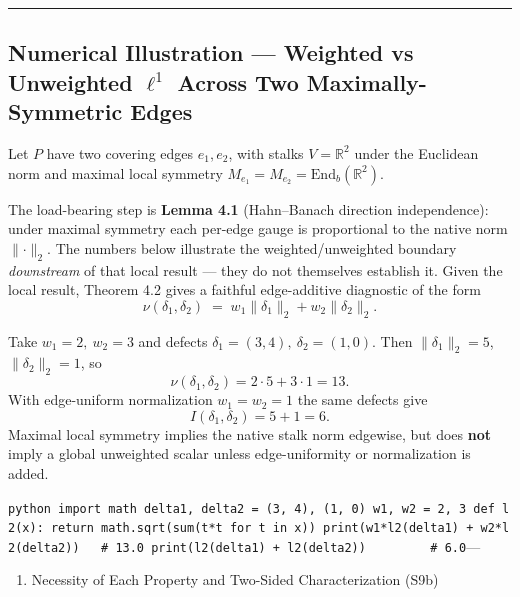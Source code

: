 \documentclass[
  11pt,
]{article}
\providecommand{\tightlist}{%
  \setlength{\itemsep}{0pt}\setlength{\parskip}{0pt}}
\providecommand{\tightlist}{%
  \setlength{\itemsep}{0pt}\setlength{\parskip}{0pt}}
\begin{document}
\begin{center}\rule{0.5\linewidth}{0.5pt}\end{center}

\subsection{\texorpdfstring{Numerical Illustration --- Weighted vs Unweighted \(\ell^1\) Across Two Maximally-Symmetric Edges}{Numerical Illustration --- Weighted vs Unweighted \textbackslash ell\^{}1 Across Two Maximally-Symmetric Edges}}\label{numerical-illustration-weighted-vs-unweighted-ell1-across-two-maximally-symmetric-edges}

Let \(P\) have two covering edges \(e_1,e_2\), with stalks \(V=\mathbb{R}^2\) under the Euclidean norm and maximal local symmetry \(M_{e_1}=M_{e_2}=\mathrm{End}_b(\mathbb{R}^2)\).

The load-bearing step is \textbf{Lemma 4.1} (Hahn--Banach direction independence): under maximal symmetry each per-edge gauge is proportional to the native norm \(\lVert\cdot\rVert_2\). The numbers below illustrate the weighted/unweighted boundary \emph{downstream} of that local result --- they do not themselves establish it. Given the local result, Theorem 4.2 gives a faithful edge-additive diagnostic of the form
\[\nu(\delta_1,\delta_2) \;=\; w_1\lVert\delta_1\rVert_2 + w_2\lVert\delta_2\rVert_2.\]

Take \(w_1=2,\ w_2=3\) and defects \(\delta_1=(3,4),\ \delta_2=(1,0)\). Then \(\lVert\delta_1\rVert_2=5\), \(\lVert\delta_2\rVert_2=1\), so
\[\nu(\delta_1,\delta_2) = 2\cdot 5 + 3\cdot 1 = 13.\]
With edge-uniform normalization \(w_1=w_2=1\) the same defects give
\[I(\delta_1,\delta_2) = 5 + 1 = 6.\]
Maximal local symmetry implies the native stalk norm edgewise, but does \textbf{not} imply a global unweighted scalar unless edge-uniformity or normalization is added.

\texttt{python\ import\ math\ delta1,\ delta2\ =\ (3,\ 4),\ (1,\ 0)\ w1,\ w2\ =\ 2,\ 3\ def\ l2(x):\ return\ math.sqrt(sum(t*t\ for\ t\ in\ x))\ print(w1*l2(delta1)\ +\ w2*l2(delta2))\ \ \ \#\ 13.0\ print(l2(delta1)\ +\ l2(delta2))\ \ \ \ \ \ \ \ \ \#\ 6.0}---

\begin{enumerate}
\def\labelenumi{\arabic{enumi}.}
\setcounter{enumi}{5}
\tightlist
\item
  Necessity of Each Property and Two-Sided Characterization (S9b)
\end{enumerate}
\end{document}
